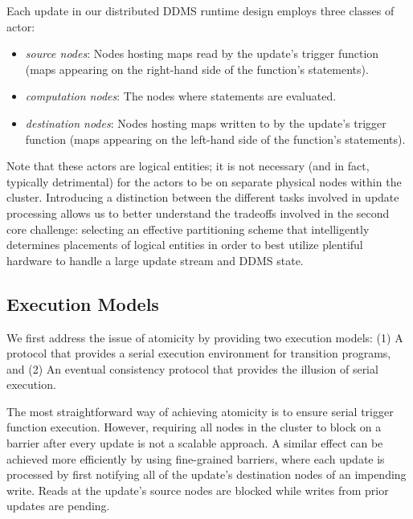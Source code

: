 Each update in our distributed DDMS runtime design employs three classes of actor:
\begin{itemize}
\item \textit{source nodes}: Nodes hosting maps read by the update's trigger
function (maps appearing on the right-hand side of the function's statements).
\item \textit{computation nodes}: The nodes where statements are evaluated.
\item \textit{destination nodes}: Nodes hosting maps written to by the update's
trigger function (maps appearing on the left-hand side of the function's
statements).
\end{itemize}
Note that these actors are logical entities; it is not necessary (and in fact,
typically detrimental) for the actors to be on separate physical nodes within
the cluster.
Introducing a distinction between the different tasks involved in
update processing allows us to better understand the tradeoffs involved in the
second core challenge: selecting an effective partitioning scheme that
intelligently determines placements of logical entities in order to best
utilize plentiful hardware to handle a large update stream and DDMS state.

\subsection{Execution Models}
We first address the issue of atomicity by providing two execution models: (1) A
protocol that provides a serial execution environment for transition programs,
and (2) An eventual consistency protocol that provides the illusion of serial
execution.

The most straightforward way of achieving atomicity is to ensure serial trigger
function execution.  However, requiring all nodes in the cluster to block on a
barrier after every update is not a scalable approach. A similar effect can be
achieved more efficiently by using fine-grained barriers, where each update is
processed by first notifying all of the update's destination nodes of an
impending write. Reads at the update's source nodes are blocked while writes
from prior updates are pending.

